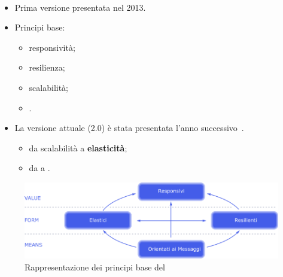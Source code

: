         \begin{frame}{\insertsectionhead}
            \begin{block}{\insertsubsectionhead~\cite{citeulike:13845446}}
                \begin{itemize}
                    \item
                        Prima versione presentata nel 2013.
                    \item
                        Principi base:
                        \begin{itemize}
                            \item responsività;
                            \item resilienza;
                            \item scalabilità;
                            \item {}.
                        \end{itemize}
                    \item
                        La versione attuale (2.0) è stata presentata l'anno successivo~\footnotemark.
                        \begin{itemize}
                            \item da scalabilità a \textbf{elasticità};
                            \item da  a \textbf{}.
                        \end{itemize}
                \end{itemize}
            \end{block}
        \end{frame}

        \begin{frame}[c]{\insertsectionhead}{\insertsubsectionhead}
            \begin{figure}[htbp]
                \centering
                \includegraphics[width=\linewidth]{reactive-traits-it}
                \caption{Rappresentazione dei principi base del }
                \label{fig:manifest}
            \end{figure}
        \end{frame}

